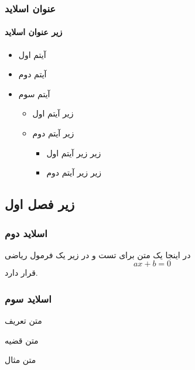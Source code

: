 \begin{frame}
\frametitle{عنوان اسلاید}
\framesubtitle{زیر عنوان اسلاید}
\begin{itemize}
\setlength\itemsep{1em} %
\item آیتم اول
\item آیتم دوم
\item آیتم سوم
\vspace{0.5em} %
\begin{itemize}
\setlength\itemsep{1em}
\item زیر آیتم اول
\item زیر آیتم دوم
\vspace{0.5em} %
\begin{itemize}
\setlength\itemsep{1em}
\item زیر زیر آیتم اول
\item زیر زیر آیتم دوم
\end{itemize}
\end{itemize}
\end{itemize}
\end{frame}


\subsection{زیر فصل اول}


\begin{frame}
\frametitle{اسلاید دوم}
در اینجا یک متن برای تست و در زیر یک فرمول ریاضی
\begin{equation*}
a x + b = 0
\end{equation*}
قرار دارد.
\end{frame}


\begin{frame}
\frametitle{اسلاید سوم}

\begin{definition}
متن تعریف
\end{definition}

\vspace{15pt} %

\begin{theorem}
متن قضیه
\end{theorem}

\begin{example}
متن مثال
\end{example}

\end{frame}

